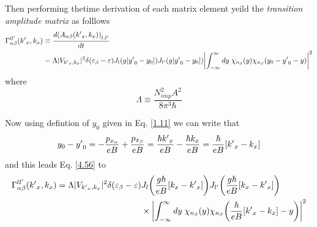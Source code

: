 Then performing thetime derivation of each matrix element yeild the \textit{transition amplitude matrix} as folllows
\begin{equation} \label{4.55}
  \begin{aligned}
    \Gamma_{\alpha\beta}^{ll'}({k'}_x,k_x) &  \equiv
    \frac{d \qty(A_{\alpha\beta}({k'}_x,k_x))_{l,l'}}{dt} \\
    & =
    \Lambda |V_{{k'}_x,k_x}|^2
    \delta(\varepsilon_{\beta} - \varepsilon)
    J_l\qty(g[{y'}_0 - y_0]) J_{l'}\qty(g[{y'}_0 - y_0])
    \qty|
    \int_{-\infty}^{\infty} dy \;
    {\chi}_{n_{\beta}}\qty(y)
    {\chi}_{n_{\beta}}\qty(y_0 - {y'}_0 - y)|^2
  \end{aligned}
\end{equation}
where
\begin{equation} \label{4.56}
    \Lambda \equiv
    \frac { N_{imp}^2 A^2}{8\pi^3 \hbar}
\end{equation}

\noindent
Now using defintion of $y_0$ given in Eq. \eqref{1.11} we can write that
\begin{equation} \label{4.57}
    y_0 - {y'}_0 =
    - \frac{p_{x_{\alpha}}}{eB} + \frac{p_{x_{\beta}}}{eB} =
    \frac{\hbar {k'}_x}{eB} - \frac{\hbar {k}_x}{eB} =
    \frac{\hbar}{eB} \qty[{k'}_x - {k}_x]
\end{equation}
and this leads Eq. \eqref{4.56} to
\begin{equation} \label{4.58}
  \begin{aligned}
    \Gamma_{\alpha\beta}^{ll'}({k'}_x,k_x) =
    \Lambda |V_{{k'}_x,k_x}|^2
    \delta(\varepsilon_{\beta} - \varepsilon) &
    J_l\qty(\frac{g\hbar}{eB}[{k}_x - {k'}_x])
    J_{l'}\qty(\frac{g\hbar}{eB}[{k}_x - {k'}_x]) \\
    & \times
    \qty|
    \int_{-\infty}^{\infty} dy \;
    {\chi}_{n_{\beta}}\qty(y)
    {\chi}_{n_{\beta}}\qty(\frac{\hbar}{eB} \qty[{k'}_x - {k}_x] - y)|^2
  \end{aligned}
\end{equation}

